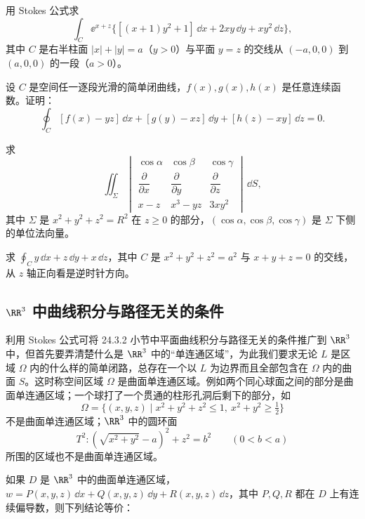 \begin{xexercise}[4]
用 Stokes 公式求
\[
  \int_C\ee^{x+z}\{[(x+1)y^2+1]\,\dd x+2xy\,\dd y+xy^2\,\dd z\},
\]
其中 $C$ 是右半柱面 $|x|+|y|=a$（$y>0$）与平面 $y=z$ 的交线从 $(-a,0,0)$ 到 $(a,0,0)$ 的一段（$a>0$）。
\end{xexercise}

\begin{xexercise}[5]
设 $C$ 是空间任一逐段光滑的简单闭曲线，$f(x),g(x),h(x)$ 是任意连续函数。证明：
\[
  \oint_C[f(x)-yz]\,\dd x+[g(y)-xz]\,\dd y+[h(z)-xy]\,\dd z=0.
\]
\end{xexercise}

\begin{xexercise}[6]
求
\[
  \iint_\Sigma
  \begin{vmatrix}
  \cos\alpha&\cos\beta&\cos\gamma\\
  \dfrac\partial{\partial x}&\dfrac\partial{\partial y}&\dfrac\partial{\partial z}\\
  x-z&x^3-yz&3xy^2
  \end{vmatrix}\,\dd S,
\]
其中 $\Sigma$ 是 $x^2+y^2+z^2=R^2$ 在 $z\ge0$ 的部分，$(\cos\alpha,\cos\beta,\cos\gamma)$ 是 $\Sigma$ 下侧的单位法向量。
\end{xexercise}

\begin{xexercise}[7]
求 $\oint_C y\,\dd x+z\,\dd y+x\,\dd z$，其中 $C$ 是 $x^2+y^2+z^2=a^2$ 与 $x+y+z=0$ 的交线，从 $z$ 轴正向看是逆时针方向。
\end{xexercise}

\subsection{\texorpdfstring{$\RR^3$ 中曲线积分与路径无关的条件}{R 三维空间中曲线积分与路径无关的条件}}

利用 Stokes 公式可将 24.3.2 小节中平面曲线积分与路径无关的条件推广到 $\RR^3$ 中，但首先要弄清楚什么是 $\RR^3$ 中的“单连通区域”，为此我们要求无论 $L$ 是区域 $\Omega$ 内的什么样的简单闭路，总存在一个以 $L$ 为边界而且全部包含在 $\Omega$ 内的曲面 $S$。这时称空间区域 $\Omega$ 是曲面单连通区域。例如两个同心球面之间的部分是曲面单连通区域；一个球打了一个贯通的柱形孔洞后剩下的部分，如
\[
  \Omega=\{(x,y,z)\mid x^2+y^2+z^2\le1,\ x^2+y^2\ge\tfrac12\}
\]
不是曲面单连通区域；$\RR^3$ 中的圆环面
\[
  T^2:(\sqrt{x^2+y^2}-a)^2+z^2=b^2\qquad(0<b<a)
\]
所围的区域也不是曲面单连通区域。

如果 $D$ 是 $\RR^3$ 中的曲面单连通区域，$w=P(x,y,z)\,\dd x+Q(x,y,z)\,\dd y+R(x,y,z)\,\dd z$，其中 $P,Q,R$ 都在 $D$ 上有连续偏导数，则下列结论等价：

